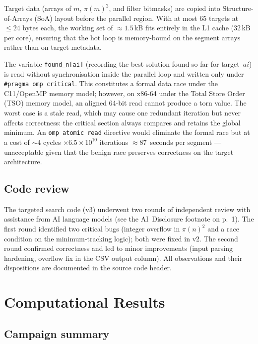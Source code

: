 \documentclass{amsart}
\theoremstyle{definition}
\theoremstyle{remark}
\numberwithin{equation}{section}
\begin{document}
Target data (arrays of $m$, $\pi(m)^2$, and filter bitmasks)
are copied into Structure-of-Arrays (SoA) layout before the
parallel region.  With at most $65$ targets at $\le 24$ bytes each,
the working set of $\approx 1.5$\,kB fits entirely in the L1 cache
(32\,kB per core), ensuring that the hot loop is memory-bound on
the segment arrays rather than on target metadata.

The variable \texttt{found\_n[ai]} (recording the best solution
found so far for target~$ai$) is read without synchronisation
inside the parallel loop and written only under
\texttt{\#pragma omp critical}.  This constitutes a formal data
race under the C11/OpenMP memory model; however, on x86-64 under
the Total Store Order (TSO) memory model, an aligned 64-bit read
cannot produce a torn value.  The worst case is a stale read, which
may cause one redundant iteration but never affects correctness:
the critical section always compares and retains the global minimum.
An \texttt{omp atomic read} directive would eliminate the formal
race but at a cost of $\sim 4$ cycles $\times 6.5 \times 10^{10}$
iterations $\approx 87$~seconds per segment --- unacceptable given
that the benign race preserves correctness on the target
architecture.

\subsection{Code review}

The targeted search code (v3) underwent two rounds of independent
review with assistance from AI language models (see the AI~Disclosure
footnote on p.~1).
The first round identified two critical bugs
(integer overflow in $\pi(n)^2$ and a race condition on the
minimum-tracking logic); both were fixed in v2.
The second round confirmed correctness and led to
minor improvements (input parsing hardening, overflow fix in the
CSV output column).
All observations and their dispositions are documented in the source
code header.

\section{Computational Results}
\label{sec:results}

\subsection{Campaign summary}
\end{document}
